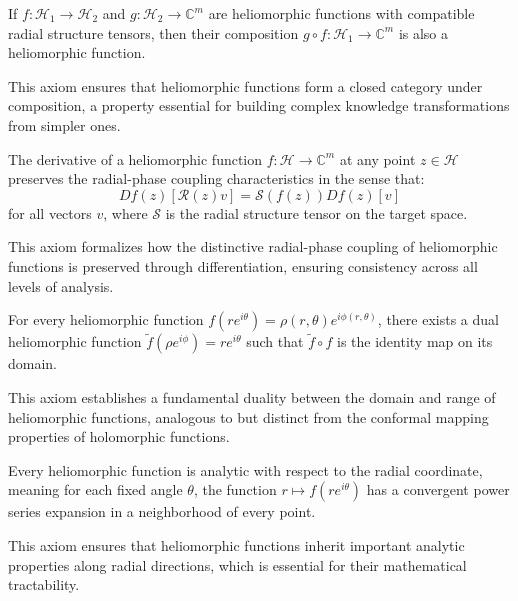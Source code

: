 \begin{axiom}
If $f: \mathcal{H}_1 \rightarrow \mathcal{H}_2$ and $g: \mathcal{H}_2 \rightarrow \mathbb{C}^m$ are heliomorphic functions with compatible radial structure tensors, then their composition $g \circ f: \mathcal{H}_1 \rightarrow \mathbb{C}^m$ is also a heliomorphic function.
\end{axiom}

This axiom ensures that heliomorphic functions form a closed category under composition, a property essential for building complex knowledge transformations from simpler ones.

\begin{axiom}
The derivative of a heliomorphic function $f: \mathcal{H} \rightarrow \mathbb{C}^m$ at any point $z \in \mathcal{H}$ preserves the radial-phase coupling characteristics in the sense that:
\begin{equation}
Df(z)[\mathcal{R}(z)v] = \mathcal{S}(f(z))Df(z)[v]
\end{equation}
for all vectors $v$, where $\mathcal{S}$ is the radial structure tensor on the target space.
\end{axiom}

This axiom formalizes how the distinctive radial-phase coupling of heliomorphic functions is preserved through differentiation, ensuring consistency across all levels of analysis.

\begin{axiom}
For every heliomorphic function $f(re^{i\theta}) = \rho(r,\theta)e^{i\phi(r,\theta)}$, there exists a dual heliomorphic function $\tilde{f}(\rho e^{i\phi}) = re^{i\theta}$ such that $\tilde{f} \circ f$ is the identity map on its domain.
\end{axiom}

This axiom establishes a fundamental duality between the domain and range of heliomorphic functions, analogous to but distinct from the conformal mapping properties of holomorphic functions.

\begin{axiom}
Every heliomorphic function is analytic with respect to the radial coordinate, meaning for each fixed angle $\theta$, the function $r \mapsto f(re^{i\theta})$ has a convergent power series expansion in a neighborhood of every point.
\end{axiom}

This axiom ensures that heliomorphic functions inherit important analytic properties along radial directions, which is essential for their mathematical tractability.

